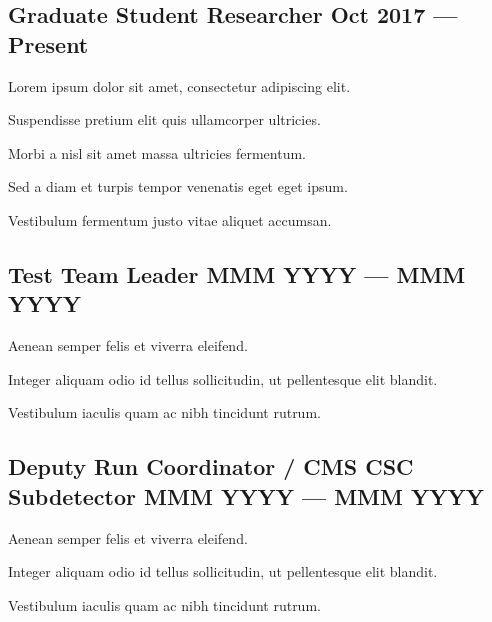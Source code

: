\documentclass[letter,10pt]{article}
\begin{document}
\subsection{{Graduate Student Researcher \hfill Oct 2017 --- Present}}
\begin{zitemize}
\item Lorem ipsum dolor sit amet, consectetur adipiscing elit.
\item Suspendisse pretium elit quis ullamcorper ultricies.
\item Morbi a nisl sit amet massa ultricies fermentum.
\item Sed a diam et turpis tempor venenatis eget eget ipsum.
\item Vestibulum fermentum justo vitae aliquet accumsan.
\end{zitemize}

\subsection{{Test Team Leader \hfill MMM YYYY --- MMM YYYY}}
\begin{zitemize}
\item Aenean semper felis et viverra eleifend.
\item Integer aliquam odio id tellus sollicitudin, ut pellentesque elit blandit.
\item Vestibulum iaculis quam ac nibh tincidunt rutrum.
\end{zitemize}

\subsection{{Deputy Run Coordinator / CMS CSC Subdetector \hfill MMM YYYY --- MMM YYYY}}
\begin{zitemize}
\item Aenean semper felis et viverra eleifend.
\item Integer aliquam odio id tellus sollicitudin, ut pellentesque elit blandit.
\item Vestibulum iaculis quam ac nibh tincidunt rutrum.
\end{zitemize}

\end{document}

